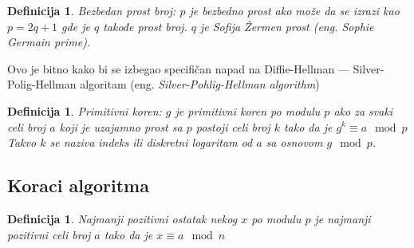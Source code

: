 \documentclass[a4paper]{article}
\newtheorem{defn}[primer]{Definicija}
\begin{document}
\begin{defn}
    \emph{Bezbedan prost broj}: $p$ je bezbedno prost ako može da se izrazi kao $p = 2q + 1$ gde je $q$ takođe prost broj. 
    $q$ je Sofija Žermen prost (eng. \emph{Sophie Germain prime}). 
\end{defn}
Ovo je bitno kako bi se izbegao specifičan napad na Diffie-Hellman --- 
Silver-Polig-Hellman algoritam (eng. \emph{Silver-Pohlig-Hellman algorithm}) \cite{dhpaper}

\begin{defn}
    \emph{Primitivni koren}: $g$ je primitivni koren po modulu $p$ ako za
    svaki celi broj $a$ koji je uzajamno prost sa $p$ postoji celi broj $k$ tako da je
    $g^k \equiv a \mod p$
    Takvo $k$ se naziva indeks ili diskretni logaritam od $a$ sa osnovom $g \mod p$.
\end{defn}


\subsection{Koraci algoritma}
\label{subsec:koraci_algoritma}

\begin{defn}
    Najmanji pozitivni ostatak nekog $x$ po modulu $p$ je najmanji pozitivni celi broj $a$ tako da je 
    $x \equiv a \mod n$
\end{defn}
\end{document}
